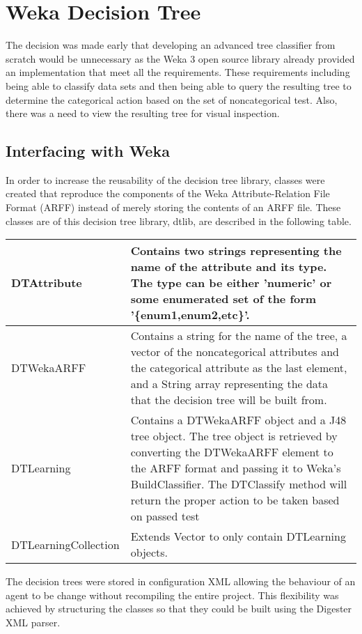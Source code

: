 \section{Weka Decision Tree}
The decision was made early that developing an advanced tree classifier from scratch would
be unnecessary as the Weka 3\cite{weka} open source library already provided an implementation that meet
all the requirements.  These requirements including being able to classify data sets and 
then being able to query the resulting tree to determine the categorical action based on the set
of noncategorical test.  Also, there was a need to view the resulting tree for visual inspection.

\subsection{Interfacing with Weka}
In order to increase the reusability of the decision tree library, classes were created that 
reproduce the components of the Weka Attribute-Relation File Format (ARFF) instead of merely
storing the contents of an ARFF file.  These classes are of this decision tree library, dtlib, 
are described in the following table.

\begin{center}
\begin{tabular}{|l|l|}
\hline
DTAttribute &
Contains two strings representing the name of the attribute and its type.
The type can be either 'numeric' or some enumerated set of the form '\{enum1,enum2,etc\}'.\\
\hline
DTWekaARFF &
Contains a string for the name of the tree, a vector of the noncategorical attributes and the 
categorical attribute as the last element, and a String array representing the data that the 
decision tree will be built from.\\
\hline
DTLearning &
Contains a DTWekaARFF object and a J48 tree object.  The tree object is retrieved by converting
the DTWekaARFF element to the ARFF format and passing it to Weka's BuildClassifier.  The
DTClassify method will return the proper action to be taken based on passed test\\
\hline
DTLearningCollection &
Extends Vector to only contain DTLearning objects.
\hline
\end{tabular}
\end{center}

The decision trees were stored in configuration XML allowing the behaviour of an agent to be change without
recompiling the entire project.  This flexibility was achieved by structuring the classes so that 
they could be built using the Digester XML parser.





